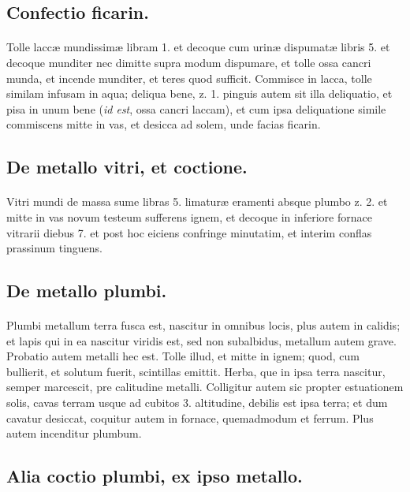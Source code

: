\documentclass[a4paper, 11pt, oneside, polutonikogreek, italian]{article}
\begin{document}
\subsection{Confectio ficarin.}
\paragraph{}
Tolle laccæ mundissimæ libram 1. et decoque cum urinæ dispumatæ libris 5. et decoque munditer nec dimitte supra modum dispumare, et tolle ossa cancri munda, et incende munditer, et teres quod sufficit. Commisce in lacca, tolle similam infusam in aqua; deliqua bene, z. 1. pinguis autem sit illa deliquatio, et pisa in unum bene (\emph{id est}, ossa cancri laccam), et cum ipsa deliquatione simile commiscens mitte in vas, et desicca ad solem, unde facias ficarin.

\subsection{De metallo vitri, et coctione.}
\paragraph{}
Vitri mundi de massa sume libras 5. limaturæ eramenti absque plumbo z. 2. et mitte in vas novum testeum sufferens ignem, et decoque in inferiore fornace vitrarii diebus 7. et post hoc eiciens confringe minutatim, et interim conflas prassinum tinguens.

\subsection{De metallo plumbi.}
\paragraph{}
Plumbi metallum terra fusca est, nascitur in omnibus locis, plus autem in calidis; et lapis qui in ea nascitur viridis est, sed non subalbidus, metallum autem grave. Probatio autem metalli hec est. Tolle illud, et mitte in ignem; quod, cum bullierit, et solutum fuerit, scintillas emittit. Herba, que in ipsa terra nascitur, semper marcescit, pre calitudine metalli. Colligitur autem sic propter estuationem solis, cavas terram usque ad cubitos 3. altitudine, debilis est ipsa terra; et dum cavatur desiccat, coquitur autem in fornace, quemadmodum et ferrum. Plus autem incenditur plumbum.

\subsection{Alia coctio plumbi, ex ipso metallo.}
\end{document}
